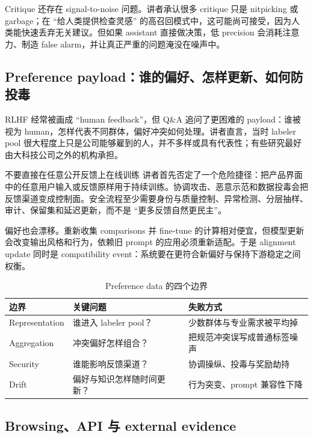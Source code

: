 Critique 还存在 signal-to-noise 问题。讲者承认很多 critique 只是 nitpicking 或 garbage；在 ``给人类提供检查灵感'' 的高召回模式中，这可能尚可接受，因为人类能快速丢弃无关建议。但如果 assistant 直接做决策，低 precision 会消耗注意力、制造 false alarm，并让真正严重的问题淹没在噪声中。

\subsection{Preference payload：谁的偏好、怎样更新、如何防投毒}

RLHF 经常被画成 ``human feedback''，但 Q\&A 追问了更困难的 payload：谁被视为 human，怎样代表不同群体，偏好冲突如何处理。讲者直言，当时 labeler pool 很大程度上只是公司能够雇到的人，并不多样或具有代表性；有些研究最好由大科技公司之外的机构承担。

\begin{importantbox}{不要直接在任意公开反馈上在线训练}
讲者首先否定了一个危险捷径：把产品界面中的任意用户输入或反馈原样用于持续训练。协调攻击、恶意示范和数据投毒会把反馈渠道变成控制面。安全流程至少需要身份与质量控制、异常检测、分层抽样、审计、保留集和延迟更新，而不是 ``更多反馈自然更民主''。
\end{importantbox}

偏好也会漂移。重新收集 comparisons 并 fine-tune 的计算相对便宜，但模型更新会改变输出风格和行为，依赖旧 prompt 的应用必须重新适配。于是 alignment update 同时是 compatibility event：系统要在更符合新偏好与保持下游稳定之间权衡。

\begin{table}[H]
\centering
\caption{Preference data 的四个边界}
\begin{tabularx}{\textwidth}{L{2.5cm} X X}
\toprule
边界 & 关键问题 & 失败方式 \\
\midrule
Representation & 谁进入 labeler pool？ & 少数群体与专业需求被平均掉 \\
Aggregation & 冲突偏好怎样组合？ & 把规范冲突误写成普通标签噪声 \\
Security & 谁能影响反馈渠道？ & 协调操纵、投毒与奖励劫持 \\
Drift & 偏好与知识怎样随时间更新？ & 行为突变、prompt 兼容性下降 \\
\bottomrule
\end{tabularx}
\end{table}

\subsection{Browsing、API 与 external evidence}

